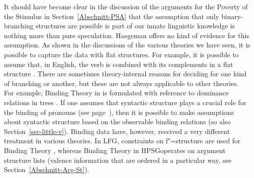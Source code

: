 It should have become clear in the discussion of the arguments for the Poverty of the Stimulus in Section~\ref{Abschnitt-PSA} that
the assumption that only binary-branching structures are possible is part of our innate linguistic knowledge is nothing more than pure
speculation. Haegeman offers no kind of evidence for this assumption. As shown in the discussions of the various theories we have seen,  
it is possible to capture the data with flat structures. For example, it is possible to assume that, in English, the verb
is combined with its complements in a flat structure \citep[]{ps2}. There are sometimes theory-internal reasons for
deciding for one kind of branching or another, but these are not always applicable to other theories. For example, Binding Theory
in \gbt is formulated with reference to dominance relations in trees \citep[]{Chomsky81a}. If one assumes that syntactic structure plays
a crucial role for the binding of pronouns (see page~\pageref{Seite-Bindungstheorie}), then it is possible to make assumptions about syntactic
structure based on the observable binding relations  (so also Section~\ref{sec-little-v}). Binding data have, however, received a very different treatment in various theories.
In LFG\indexlfg, constraints on f"=structure are used for Binding Theory \citep{Dalrymple93a}, whereas Binding Theory
in HPSG\indexhpsg operates on argument structure lists (valence information that are ordered in a particular way,
see Section~\ref{Abschnitt-Arg-St}).
 
